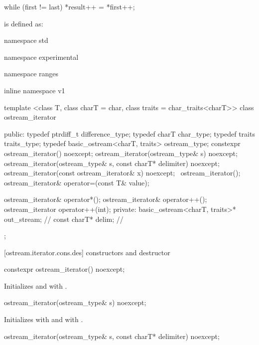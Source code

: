 \begin{codeblock}
while (first != last)
  *result++ = *first++;
\end{codeblock}

\pnum
{}
is defined as:

\begin{codeblock}
namespace std { namespace experimental { namespace ranges { inline namespace v1 {
  template <class T, class charT = char, class traits = char_traits<charT>>
  class ostream_iterator {
  public:
    typedef ptrdiff_t difference_type;
    typedef charT char_type;
    typedef traits traits_type;
    typedef basic_ostream<charT, traits> ostream_type;
    constexpr ostream_iterator() noexcept;
    ostream_iterator(ostream_type& s) noexcept;
    ostream_iterator(ostream_type& s, const charT* delimiter) noexcept;
    ostream_iterator(const ostream_iterator& x) noexcept;
    ~ostream_iterator();
    ostream_iterator& operator=(const T& value);

    ostream_iterator& operator*();
    ostream_iterator& operator++();
    ostream_iterator operator++(int);
  private:
    basic_ostream<charT, traits>* out_stream;  // \expos
    const charT* delim;                        // \expos
  };
}}}}
\end{codeblock}

[ostream.iterator.cons.des]{ constructors and destructor}

%
\begin{itemdecl}
constexpr ostream_iterator() noexcept;
\end{itemdecl}

\begin{itemdescr}
\pnum
\effects
Initializes  and  with .
\end{itemdescr}

%
\begin{itemdecl}
ostream_iterator(ostream_type& s) noexcept;
\end{itemdecl}

\begin{itemdescr}
\pnum
\effects
Initializes  with  and  with .
\end{itemdescr}

%
\begin{itemdecl}
ostream_iterator(ostream_type& s, const charT* delimiter) noexcept;
\end{itemdecl}

